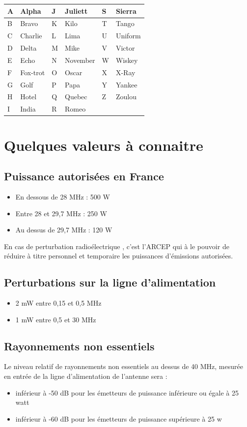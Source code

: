 \documentclass[a4paper,12pt,oneside]{report} %
\begin{document}
			\begin{center}
			\begin{longtable}{|L{1cm}|L{3.5cm}||L{1cm}|L{3.5cm}||L{1cm}|L{3.5cm}|}
			\hline
				A & Alpha & 			J & Juliett &				S & Sierra \tabularnewline
			\hline
				B & Bravo & 			K & Kilo &				T & Tango \tabularnewline
			\hline
				C & Charlie & 			L & Lima &				U & Uniform \tabularnewline
			\hline
				D & Delta & 			M & Mike &				V & Victor \tabularnewline	
			\hline
				E & Echo & 			N & November &				W & Wiskey \tabularnewline
			\hline
				F & Fox-trot & 			O & Oscar &				X & X-Ray \tabularnewline
			\hline
				G & Golf & 			P & Papa &				Y & Yankee \tabularnewline
			\hline
				H & Hotel & 			Q & Quebec &				Z & Zoulou \tabularnewline
			\hline
				I & India & 			R & Romeo &				  & \tabularnewline
			\hline
			\end{longtable}
			\end{center}
			
		\section{Quelques valeurs à connaitre}
			\subsection{Puissance autorisées en France}
			\begin{itemize}
				\item En dessous de 28 MHz : 500 W
				\item Entre 28 et 29,7 MHz : 250 W
				\item Au dessus de 29,7 MHz : 120 W
			\end{itemize}
			
			En cas de perturbation radioélectrique , c'est l'ARCEP qui à le pouvoir de réduire à titre personnel et temporaire les puissances d'émissions autorisées.
			
			\subsection{Perturbations sur la ligne d'alimentation}
			\begin{itemize}
				\item 2 mW entre 0,15 et 0,5 MHz
				\item 1 mW entre 0,5 et 30 MHz
			\end{itemize}
			
			\subsection{Rayonnements non essentiels}
			Le niveau relatif de rayonnements non essentiels au dessus de 40 MHz, mesurée en entrée de la ligne d'alimentation de l'antenne sera :
			\begin{itemize}
				\item inférieur à -50 dB pour les émetteurs de puissance inférieure ou égale à 25 watt
				\item inférieur à -60 dB pour les émetteurs de puissance supérieure à 25 w
			\end{itemize}
			
\end{document}
